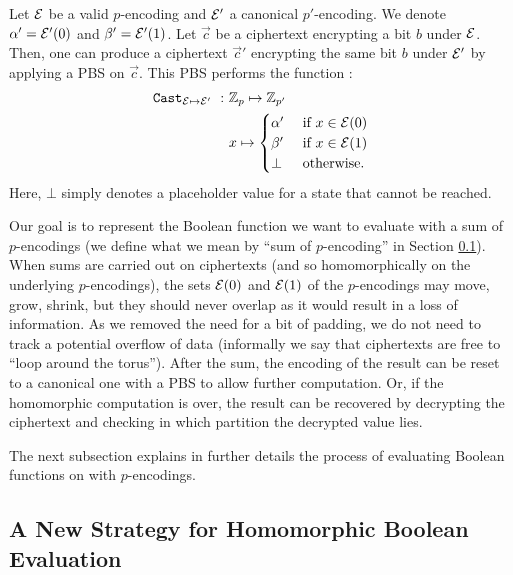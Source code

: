 \begin{property} 
    \label{prop:cast_valid_to_canonical}
    Let $\mathcal{E}$ be a valid $p$-encoding and $\mathcal{E}'$ a canonical $p'$-encoding. We denote $\alpha' = \mathcal{E}'(0)$ and $\beta' = \mathcal{E}'(1)$. Let $\vec c$ be a ciphertext encrypting a bit $b$ under $\mathcal{E}$. Then, one can produce a ciphertext $\vec c'$ encrypting the same bit $b$ under $\mathcal{E}'$ by applying a \gls{PBS} on $\vec c$. This \gls{PBS} performs the function :
    \[
        \begin{aligned}
            \texttt{Cast}_{\mathcal{E} \mapsto \mathcal{E}'}~:~& \mathbb{Z}_p \mapsto \mathbb{Z}_{p'}\\
            & x \mapsto \begin{cases}
                            \alpha' & \text{ if } x \in \mathcal{E}(0)\\
                            \beta' & \text{ if } x \in \mathcal{E}(1)\\
                            \bot & \text{ otherwise.}
                        \end{cases}
        \end{aligned}
    \]
    Here, $\bot$ simply denotes a placeholder value for a state that cannot be reached.
\end{property}



Our goal is to represent the Boolean function we want to evaluate with a sum of $p$-encodings (we define what we mean by ``sum of $p$-encoding'' in Section \ref{sec:p_encodings_new_strategy}).  When sums are carried out on ciphertexts (and so homomorphically on the underlying $p$-encodings), the sets $\mathcal{E}(0)$ and $\mathcal{E}(1)$ of the $p$-encodings may move, grow, shrink, but they should never overlap as it would result in a loss of information. As we removed the need for a bit of padding, we do not need to track a potential overflow of data (informally we say that ciphertexts are free to ``loop around the torus''). After the sum, the encoding of the result can be reset to a canonical one with a \gls{PBS} to allow further computation. Or, if the homomorphic computation is over, the result can be recovered by decrypting the ciphertext and checking in which partition the decrypted value lies.


The next subsection explains in further details the process of evaluating Boolean functions on with $p$-encodings.



\subsection{A New Strategy for Homomorphic Boolean Evaluation}
\label{sec:p_encodings_new_strategy}



